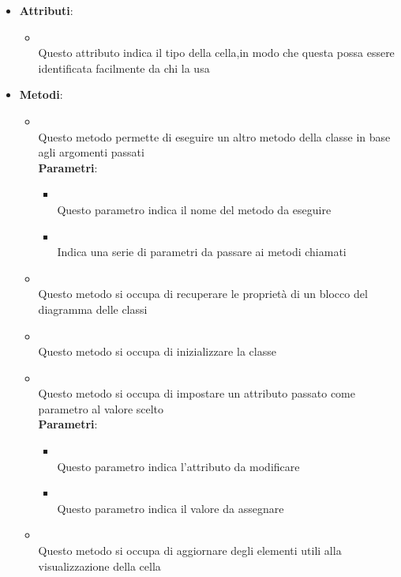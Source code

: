 \begin{itemize}
\begin{itemize}
\end{itemize}
\item \textbf{Attributi}:
\begin{itemize}
\item {}
\\ Questo attributo indica il tipo della cella,in modo che questa possa essere identificata facilmente da chi la usa
\end{itemize}
\item \textbf{Metodi}:
\begin{itemize}
\item {}
\\ Questo metodo permette di eseguire un altro metodo della classe in base agli argomenti passati
\\ \textbf{Parametri}:
\begin{itemize}
\item {}
\\ Questo parametro indica il nome del metodo da eseguire
\item {}
\\ Indica una serie di parametri da passare ai metodi chiamati
\end{itemize}
\item {}
\\ Questo metodo si occupa di recuperare le proprietà di un blocco del diagramma delle classi
\item {}
\\ Questo metodo si occupa di inizializzare la classe
\item {}
\\ Questo metodo si occupa di impostare un attributo passato come parametro al valore scelto
\\ \textbf{Parametri}:
\begin{itemize}
\item {}
\\ Questo parametro indica l'attributo da modificare
\item {}
\\ Questo parametro indica il valore da assegnare
\end{itemize}
\item {}
\\ Questo metodo si occupa di aggiornare degli elementi utili alla visualizzazione della cella
\end{itemize}
\end{itemize}

